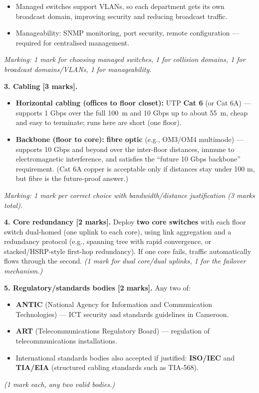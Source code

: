 \documentclass[11pt]{article}
\newcommand{\cle}[1]{{\popxbold\color{popdark}#1}}
\begin{document}
\begin{corrige}
\begin{itemize}
\item Managed switches support \cle{VLANs}, so each department gets its own \cle{broadcast domain}, improving security and reducing broadcast traffic.
\item Manageability: SNMP monitoring, port security, remote configuration — required for centralised management.
\end{itemize}
\emph{Marking: 1 mark for choosing managed switches, 1 for collision domains, 1 for broadcast domains/VLANs, 1 for manageability.}
\par
\textbf{3. Cabling [3 marks].}
\begin{itemize}
\item \textbf{Horizontal cabling (offices to floor closet):} UTP \textbf{Cat 6} (or Cat 6A) — supports 1 Gbps over the full \SI{100}{m} and 10 Gbps up to about \SI{55}{m}, cheap and easy to terminate; runs here are short (one floor).
\item \textbf{Backbone (floor to core):} \textbf{fibre optic} (e.g., OM3/OM4 multimode) — supports 10 Gbps and beyond over the inter-floor distances, immune to electromagnetic interference, and satisfies the ``future 10 Gbps backbone'' requirement. (Cat 6A copper is acceptable only if distances stay under 100 m, but fibre is the future-proof answer.)
\end{itemize}
\emph{Marking: 1 mark per correct choice with bandwidth/distance justification (3 marks total).}
\par
\textbf{4. Core redundancy [2 marks].} Deploy \textbf{two core switches} with each floor switch dual-homed (one uplink to each core), using link aggregation and a redundancy protocol (e.g., spanning tree with rapid convergence, or stacked/HSRP-style first-hop redundancy). If one core fails, traffic automatically flows through the second. \emph{(1 mark for dual core/dual uplinks, 1 for the failover mechanism.)}
\par
\textbf{5. Regulatory/standards bodies [2 marks].} Any two of:
\begin{itemize}
\item \textbf{ANTIC} (National Agency for Information and Communication Technologies) — ICT security and standards guidelines in Cameroon.
\item \textbf{ART} (Telecommunications Regulatory Board) — regulation of telecommunications installations.
\item International standards bodies also accepted if justified: \textbf{ISO/IEC} and \textbf{TIA/EIA} (structured cabling standards such as TIA-568).
\end{itemize}
\emph{(1 mark each, any two valid bodies.)}
\end{corrige}
\end{document}
